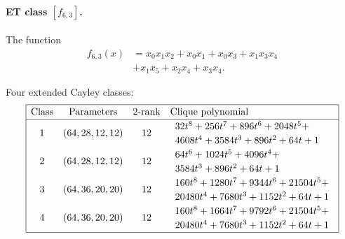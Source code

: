 \documentclass[12pt,a4paper]{article}
\begin{document}
\paragraph*{ET class $[f_{6,3}]$.}

The function
\begin{align*}
f_{6,3}(x) &= x_{0} x_{1} x_{2} + x_{0} x_{1} + x_{0} x_{3} + x_{1} x_{3} x_{4}
\\
           &+ x_{1} x_{5} + x_{2} x_{4} + x_{3} x_{4}.
\end{align*}

Four extended Cayley classes:
\small{}
\begin{align*}
\def\arraystretch{1.2}
\begin{array}{|cccl|}
\hline
\text{Class} &
\text{Parameters} &
\text{2-rank} &
\text{Clique polynomial}
\\
\hline
1 &
(64, 28, 12, 12) & 12 &
\begin{array}{l}
32t^{8} + 256t^{7} + 896t^{6} + 2048t^{5} +
\\
4608t^{4} + 3584t^{3} + 896t^{2} + 64t + 1
\end{array}
\\
2 &
(64, 28, 12, 12) & 12 &
\begin{array}{l}
64t^{6} + 1024t^{5} + 4096t^{4} +
\\
3584t^{3} + 896t^{2} + 64t + 1
\end{array}
\\
3 &
(64, 36, 20, 20) & 12 &
\begin{array}{l}
160t^{8} + 1280t^{7} + 9344t^{6} + 21504t^{5} +
\\
20480t^{4} + 7680t^{3} + 1152t^{2} + 64t + 1
\end{array}
\\
4 &
(64, 36, 20, 20) & 12 &
\begin{array}{l}
160t^{8} + 1664t^{7} + 9792t^{6} + 21504t^{5} +
\\
20480t^{4} + 7680t^{3} + 1152t^{2} + 64t + 1
\end{array}
\\
\hline
\end{array}
\end{align*}
\end{document}
